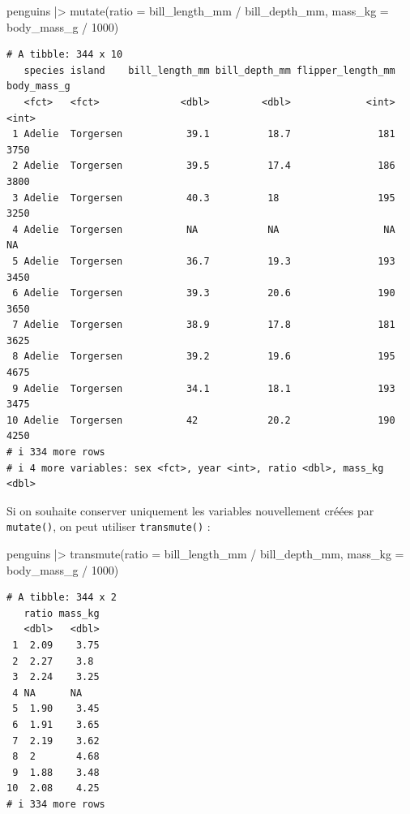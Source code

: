 \documentclass[
  a4paper,
  DIV=11,
  numbers=noendperiod,
  oneside]{scrreprt}
\newenvironment{Shaded}{}{}
\newcommand{\AttributeTok}[1]{\textcolor[rgb]{0.84,0.23,0.29}{#1}}
\newcommand{\DecValTok}[1]{\textcolor[rgb]{0.00,0.36,0.77}{#1}}
\newcommand{\FunctionTok}[1]{\textcolor[rgb]{0.44,0.26,0.76}{#1}}
\newcommand{\NormalTok}[1]{\textcolor[rgb]{0.14,0.16,0.18}{#1}}
\newcommand{\SpecialCharTok}[1]{\textcolor[rgb]{0.00,0.36,0.77}{#1}}
\begin{document}
\begin{Shaded}
\begin{Highlighting}[]
\NormalTok{penguins }\SpecialCharTok{|\textgreater{}}
  \FunctionTok{mutate}\NormalTok{(}\AttributeTok{ratio =}\NormalTok{ bill\_length\_mm }\SpecialCharTok{/}\NormalTok{ bill\_depth\_mm,}
         \AttributeTok{mass\_kg =}\NormalTok{ body\_mass\_g }\SpecialCharTok{/} \DecValTok{1000}\NormalTok{)}
\end{Highlighting}
\end{Shaded}

\begin{verbatim}
# A tibble: 344 x 10
   species island    bill_length_mm bill_depth_mm flipper_length_mm body_mass_g
   <fct>   <fct>              <dbl>         <dbl>             <int>       <int>
 1 Adelie  Torgersen           39.1          18.7               181        3750
 2 Adelie  Torgersen           39.5          17.4               186        3800
 3 Adelie  Torgersen           40.3          18                 195        3250
 4 Adelie  Torgersen           NA            NA                  NA          NA
 5 Adelie  Torgersen           36.7          19.3               193        3450
 6 Adelie  Torgersen           39.3          20.6               190        3650
 7 Adelie  Torgersen           38.9          17.8               181        3625
 8 Adelie  Torgersen           39.2          19.6               195        4675
 9 Adelie  Torgersen           34.1          18.1               193        3475
10 Adelie  Torgersen           42            20.2               190        4250
# i 334 more rows
# i 4 more variables: sex <fct>, year <int>, ratio <dbl>, mass_kg <dbl>
\end{verbatim}

Si on souhaite conserver uniquement les variables nouvellement créées
par \texttt{mutate()}, on peut utiliser \texttt{transmute()} :

\begin{Shaded}
\begin{Highlighting}[]
\NormalTok{penguins }\SpecialCharTok{|\textgreater{}}
  \FunctionTok{transmute}\NormalTok{(}\AttributeTok{ratio =}\NormalTok{ bill\_length\_mm }\SpecialCharTok{/}\NormalTok{ bill\_depth\_mm,}
            \AttributeTok{mass\_kg =}\NormalTok{ body\_mass\_g }\SpecialCharTok{/} \DecValTok{1000}\NormalTok{)}
\end{Highlighting}
\end{Shaded}

\begin{verbatim}
# A tibble: 344 x 2
   ratio mass_kg
   <dbl>   <dbl>
 1  2.09    3.75
 2  2.27    3.8 
 3  2.24    3.25
 4 NA      NA   
 5  1.90    3.45
 6  1.91    3.65
 7  2.19    3.62
 8  2       4.68
 9  1.88    3.48
10  2.08    4.25
# i 334 more rows
\end{verbatim}
\end{document}

